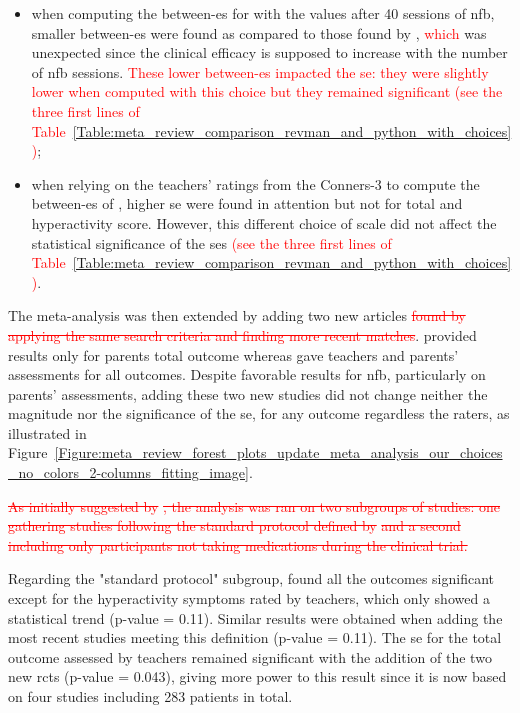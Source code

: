 \begin{itemize}
    \item when computing the between-\gls{es} for \citet{Arnold2014} with the values after 40 sessions of \gls{nfb}, 
      smaller between-\gls{es} were found as compared to those found by \citet{Cortese2016}, \textcolor{red}{which} was unexpected since  
			the clinical efficacy is supposed to increase with the number of \gls{nfb} sessions. \textcolor{red}{These lower between-\gls{es}
			impacted the \gls{se}: they were slightly lower when computed with this choice but they remained significant (see the three first lines 
			of Table~\ref{Table:meta_review_comparison_revman_and_python_with_choices})};  
    \item when relying on the teachers' ratings from the Conners-3 to compute the between-\gls{es} of \citet{Steiner2014}, 
		higher \gls{se} were found in attention but not for total and hyperactivity score. However, this different choice of 
		scale did not affect the statistical significance of the \glspl{se} \textcolor{red}{(see the three first lines 
			of Table~\ref{Table:meta_review_comparison_revman_and_python_with_choices})}.
\end{itemize}

The meta-analysis was then extended by adding two new articles \citep{Strehl2017, Baumeister2016} \textcolor{red}{\sout{found 
by applying the same search criteria and finding more recent matches}}. \citet{Baumeister2016} provided results 
only for parents total outcome whereas \citet{Strehl2017} gave teachers and parents' assessments for all outcomes. 
Despite favorable results for \gls{nfb}, particularly on parents' assessments, adding these two new studies did not 
change neither the magnitude nor the significance of the \gls{se}, for any outcome regardless the raters,
as illustrated in Figure~\ref{Figure:meta_review_forest_plots_update_meta_analysis_our_choices_no_colors_2-columns_fitting_image}. 
 
\textcolor{red}{\sout{As initially suggested by }}\citeauthor{Cortese2016}\textcolor{red}{\sout{, the analysis was ran on two subgroups of studies: one gathering 
studies following the standard protocol defined by }} \citet{Arns2014} \textcolor{red}{\sout{and a second including only participants not taking medications 
during the clinical trial. }}

Regarding the "standard protocol" subgroup, \citet{Cortese2016} found all the outcomes significant except for the 
hyperactivity symptoms rated by teachers, which only showed a statistical trend (p-value = 0.11). Similar results 
were obtained when adding the most recent studies meeting this definition \citep{Strehl2017} (p-value = 0.11). 
The \gls{se} for the total outcome assessed by teachers remained significant with the addition of the two new
\glspl{rct} (p-value = 0.043), giving more power to this result since it is now based on four studies including 283
patients in total.

